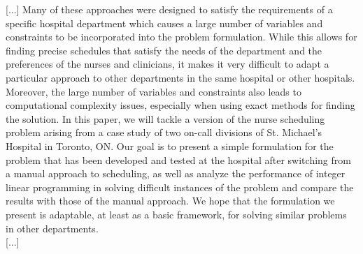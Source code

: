 [...] Many of these approaches were designed to satisfy the requirements of a specific hospital department which causes a large number of variables and constraints to be incorporated into the problem formulation. While this allows for finding precise schedules that satisfy the needs of the department and the preferences of the nurses and clinicians, it makes it very difficult to adapt a particular approach to other departments in the same hospital or other hospitals. Moreover, the large number of variables and constraints also leads to computational complexity issues, especially when using exact methods for finding the solution. In this paper, we will tackle a version of the nurse scheduling problem arising from a case study of two on-call divisions of St. Michael's Hospital in Toronto, ON. Our goal is to present a simple formulation for the problem that has been developed and tested at the hospital after switching from a manual approach to scheduling, as well as analyze the performance of integer linear programming in solving difficult instances of the problem and compare the results with those of the manual approach. We hope that the formulation we present is adaptable, at least as a basic framework, for solving similar problems in other departments. \\

[...]


